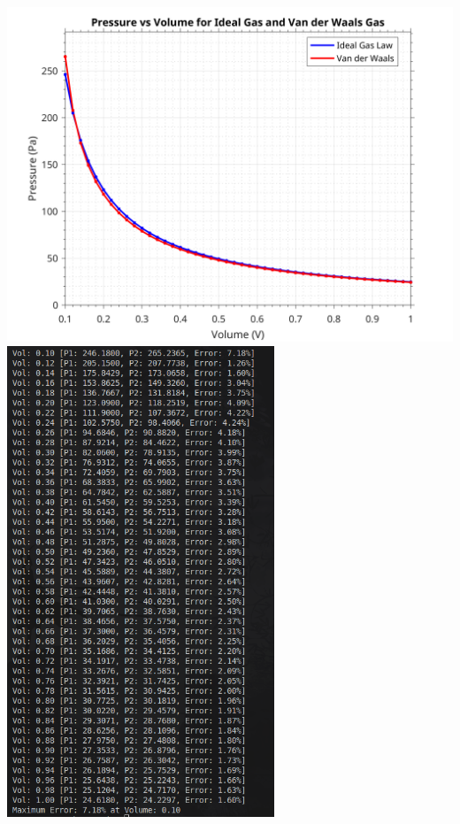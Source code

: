 \documentclass[a4paper, 12pt]{report}
\begin{document}
    \includegraphics[width=1\textwidth]{images/pressurevolume.png}
    \includegraphics[width=0.6\textwidth]{images/q6.png}
    
\end{document}
